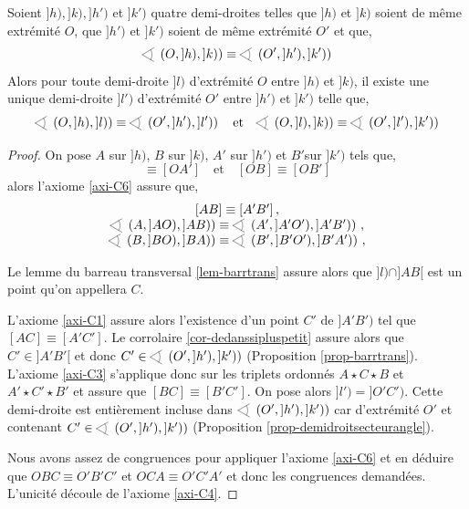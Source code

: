 \begin{thm}\label{thm-hilbert13}
    Soient $]h),]k),]h')$ et $]k')$ quatre demi-droites telles que $]h)$ et $]k)$ soient de même extrémité $O$, que $]h')$ et $]k')$ soient de même extrémité $O'$ et que,
    \begin{equation*}
        \anglesaillant \left(O,]h),]k)\right)\equiv\anglesaillant \left(O',]h'),]k')\right)
    \end{equation*}
    Alors pour toute demi-droite $]l)$ d'extrémité $O$ entre $]h)$ et $]k)$, il existe une unique demi-droite $]l')$ d'extrémité $O'$ entre $]h')$ et $]k')$ telle que,
    \begin{equation*}
        \anglesaillant \left(O,]h),]l)\right)\equiv\anglesaillant \left(O',]h'),]l')\right) \quad \text{et} \quad \anglesaillant \left(O,]l),]k)\right)\equiv\anglesaillant \left(O',]l'),]k')\right)
    \end{equation*}
\begin{proof}
    On pose $A$ sur $]h)$, $B$ sur $]k)$, $A'$ sur $]h')$ et $B'$sur $]k')$ tels que,
    \begin{equation*}
        [OA]\equiv[OA'] \quad \text{et} \quad [OB]\equiv[OB']
    \end{equation*}
    alors l'axiome \ref{axi-C6} assure que,
    \begin{equation*}
        \begin{array}{c}
            [AB]\equiv[A'B']\,, \\
            \anglesaillant \left(A,]AO),]AB)\right) \equiv \anglesaillant \left(A',]A'O'),]A'B')\right)\,, \\
            \anglesaillant \left(B,]BO),]BA)\right) \equiv \anglesaillant \left(B',]B'O'),]B'A')\right) \,, 
        \end{array}
    \end{equation*}

    Le lemme du barreau transversal \ref{lem-barrtrans} assure alors que $]l)\cap ]AB[$ est un point qu'on appellera $C$. 

    L'axiome \ref{axi-C1} assure alors l'existence d'un point $C'$ de $]A'B')$ tel que $[AC]\equiv[A'C']$. %
    Le corrolaire \ref{cor-dedanssipluspetit} assure alors que $C'\in ]A'B'[$ et donc $C'\in \anglesaillant \left(O',]h'),]k')\right)$ (Proposition \ref{prop-barrtrans}). L'axiome \ref{axi-C3} s'applique donc sur les triplets ordonnés $A\star C\star B$ et $A' \star C' \star B'$ et assure que $[BC]\equiv [B'C']$. On pose alors $]l') = ]O'C')$. Cette demi-droite est entièrement incluse dans $\anglesaillant \left(O',]h'),]k')\right)$ car d'extrémité $O'$ et contenant $C'\in \anglesaillant \left(O',]h'),]k')\right)$ (Proposition \ref{prop-demidroitsecteurangle}).

    Nous avons assez de congruences pour appliquer l'axiome \ref{axi-C6} et en déduire que $OBC\equiv O'B'C'$ et $OCA\equiv O'C'A'$ et donc les congruences demandées.  L'unicité découle de l'axiome \ref{axi-C4}.
\end{proof}
\end{thm}
